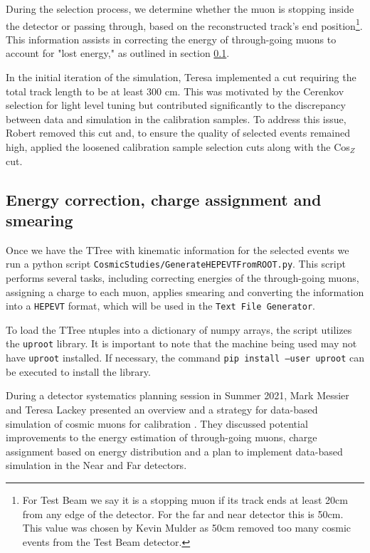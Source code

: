 \documentclass[12pt]{article}
\begin{document}
During the selection process, we determine whether the muon is stopping inside the detector or passing through, based on the reconstructed track's end position\footnote{For Test Beam we say it is a stopping muon if its track ends at least 20cm from any edge of the detector. For the far and near detector this is 50cm. This value was chosen by Kevin Mulder \cite{NOVA-doc-39244-v1} as 50cm removed too many cosmic events from the Test Beam detector.}. This information assists in correcting the energy of through-going muons to account for "lost energy," as outlined in section \ref{secPython}.

In the initial iteration of the simulation, Teresa implemented a cut requiring the total track length to be at least 300 cm. This was motivated by the Cerenkov selection for light level tuning but contributed significantly to the discrepancy between data and simulation in the calibration samples. To address this issue, Robert removed this cut and, to ensure the quality of selected events remained high, applied the loosened calibration sample selection cuts along with the Cos$_Z$ cut.

\FloatBarrier
\subsection{Energy correction, charge assignment and smearing}\label{secPython}
Once we have the TTree with kinematic information for the selected events we run a python script \texttt{CosmicStudies/GenerateHEPEVTFromROOT.py}. This script performs several tasks, including correcting energies of the through-going muons, assigning a charge to each muon, applies smearing and converting the information into a \texttt{HEPEVT} format, which will be used in the \texttt{Text File Generator}.

To load the TTree ntuples into a dictionary of numpy arrays, the script utilizes the \texttt{uproot} library. It is important to note that the machine being used may not have \texttt{uproot} installed. If necessary, the command \texttt{pip install --user uproot} can be executed to install the library.

During a detector systematics planning session in Summer 2021, Mark Messier and Teresa Lackey presented an overview and a strategy for data-based simulation of cosmic muons for calibration \cite{NOVA-doc-51327-v3}. They discussed potential improvements to the energy estimation of through-going muons, charge assignment based on energy distribution and a plan to implement data-based simulation in the Near and Far detectors.
\end{document}

